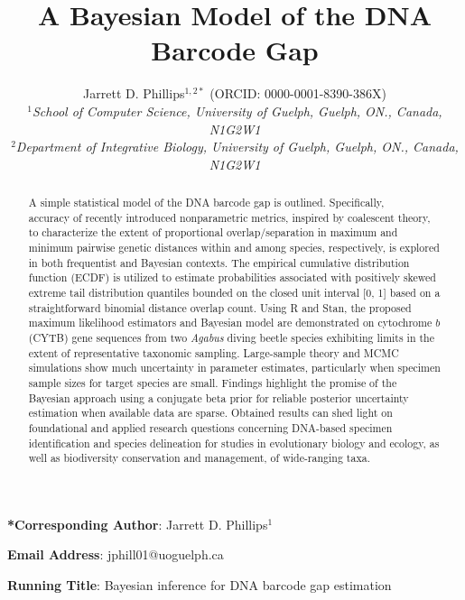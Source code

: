 \documentclass[12pt]{article}
\makeatletter
\renewcommand{\maketitle}{\bgroup\setlength{\parindent}{0pt}
\begin{flushleft}
\textbf{\@title}

  \@author
\end{flushleft}\egroup
}
\makeatother
\begin{document}
\linenumbers

\title{A Bayesian Model of the DNA Barcode Gap}

\author{Jarrett D. Phillips$^{1, 2*}$ (ORCID: 0000-0001-8390-386X)  \\
\textit{$^1$School of Computer Science, University of Guelph, Guelph, ON., Canada, N1G2W1} \\ \textit{$^2$Department of Integrative Biology, University of Guelph, Guelph, ON., Canada, N1G2W1} }

\date{}

\maketitle

\vspace{2mm}

\noindent \textbf{*Corresponding Author}: Jarrett D. Phillips$^{1}$

\noindent \textbf{Email Address}: jphill01@uoguelph.ca

\noindent \textbf{Running Title}: Bayesian inference for DNA barcode gap estimation

\newpage

\begin{abstract}

A simple statistical model of the DNA barcode gap is outlined. Specifically, \\ accuracy of recently introduced nonparametric metrics, inspired by coalescent theory, to characterize the extent of proportional overlap/separation in maximum and minimum pairwise genetic distances within and among species, respectively, is explored in both frequentist and Bayesian contexts. The empirical cumulative distribution function (ECDF) is utilized to estimate probabilities associated with positively skewed extreme tail distribution quantiles bounded on the closed unit interval [0, 1] based on a \\ straightforward binomial distance overlap count. Using R and Stan, the proposed maximum likelihood estimators and Bayesian model are demonstrated on cytochrome $b$ (CYTB) gene sequences from two \textit{Agabus} diving beetle species exhibiting limits in the extent of representative taxonomic sampling. Large-sample theory and MCMC simulations show much uncertainty in parameter estimates, particularly when specimen sample sizes for target species are small. Findings highlight the promise of the Bayesian approach using a conjugate beta prior for reliable posterior uncertainty estimation when available data are sparse. Obtained results can shed light on foundational and applied research questions concerning DNA-based specimen identification and species delineation for studies in evolutionary biology and ecology, as well as biodiversity conservation and management, of wide-ranging taxa.

\end{abstract}
\end{document}
